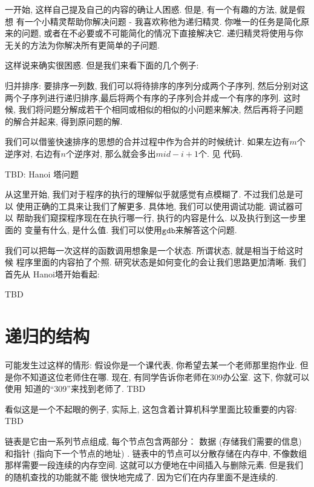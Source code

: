 一开始, 这样自己提及自己的内容的确让人困惑. 但是, 有一个有趣的方法, 就是假想
有一个小精灵帮助你解决问题 - 我喜欢称他为递归精灵. 
你唯一的任务是简化原来的问题, 或者在不必要或不可能简化的情况下直接解决它. 
递归精灵将使用与你无关的方法为你解决所有更简单的子问题. 

这样说来确实很困惑. 但是我们来看下面的几个例子: 

\begin{example}
    归并排序: 要排序一列数, 我们可以将待排序的序列分成两个子序列,
    然后分别对这两个子序列进行递归排序,最后将两个有序的子序列合并成一个有序的序列.
    这时候, 我们将问题分解成若干个相同或相似的相似的小问题来解决, 
    然后再将子问题的解合并起来, 得到原问题的解. 
\end{example}

 我们可以借鉴快速排序的思想的合并过程中作为合并的时候统计. 
如果左边有$m$个逆序对, 右边有$n$个逆序对, 那么就会多出$mid-i+1$个. 见
代码. 

\begin{example}
    TBD: Hanoi 塔问题
\end{example}


从这里开始, 我们对于程序的执行的理解似乎就感觉有点模糊了. 不过我们总是可以
使用正确的工具来让我们了解更多. 具体地, 我们可以使用调试功能. 调试器可以
帮助我们窥探程序现在在执行哪一行, 执行的内容是什么. 以及执行到这一步里面的
变量有什么, 是什么值. 我们可以使用$\texttt{gdb}$来解答这个问题. 

我们可以把每一次这样的函数调用想象是一个状态. 所谓状态, 就是相当于给这时候
程序里面的内容拍了个照. 研究状态是如何变化的会让我们思路更加清晰. 我们首先从
Hanoi塔开始看起: 

TBD

\section{递归的结构}

 可能发生过这样的情形: 假设你是一个课代表, 你希望去某一个老师那里抱作业. 
但是你不知道这位老师住在哪. 现在, 有同学告诉你老师在309办公室. 这下, 你就可以使用
知道的``309''来找到老师了. TBD

看似这是一个不起眼的例子, 实际上, 这包含着计算机科学里面比较重要的内容: TBD

 链表是它由一系列节点组成, 每个节点包含两部分：
数据 (存储我们需要的信息) 和指针 (指向下一个节点的地址) . 
链表中的节点可以分散存储在内存中, 不像数组那样需要一段连续的内存空间. 
这就可以方便地在中间插入与删除元素. 但是我们的随机查找的功能就不能
很快地完成了. 因为它们在内存里面不是连续的. 

